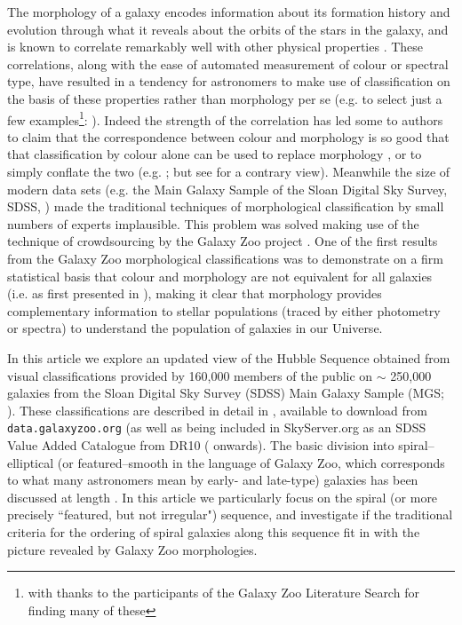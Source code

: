 \documentclass[usenatbib]{mn2e}
\begin{document}
The morphology of a galaxy encodes information about its formation history and evolution through what it reveals about the orbits of the stars in the galaxy, and is known to correlate remarkably well with other physical properties \citep[e.g.][]{RobertsHaynes1994, Kennicutt1998, Strateva2001}. These correlations, along with the ease of automated measurement of colour or spectral type, have resulted in a tendency for astronomers to make use of classification on the basis of these properties rather than morphology per se (e.g. to select just a few examples\footnote{with thanks to the participants of the Galaxy Zoo Literature Search for finding many of these}: \citealt{Bell2004, Weinmann2006, vandenBosch2008, Cooper2010, Zehavi2011}). Indeed the strength of the correlation has led some to authors to claim that the correspondence between colour and morphology is so good that that classification by colour alone can be used to replace morphology \citep[e.g.][]{ParkChoi2005, Faber2007, AscasibarAlmeida2011}, or to simply conflate the two (e.g. \citealt{TalvanDokkum2011}; but see \citealt{vandenBergh2007} for a contrary view). Meanwhile the size of modern data sets (e.g. the Main Galaxy Sample of the Sloan Digital Sky Survey, SDSS, \citealt{Strauss2002}) made the traditional techniques of morphological classification by small numbers of experts implausible. This problem was solved making use of the technique of crowdsourcing by the Galaxy Zoo project \citep{Lintott2008,Lintott2011}. One of the first results from the Galaxy Zoo morphological classifications was to demonstrate on a firm statistical basis that colour and morphology are not equivalent for all galaxies (i.e. as first presented in \citealt{Bamford2009, Schawinski2009,Masters2010}), making it clear that morphology provides complementary information to stellar populations (traced by either photometry or spectra) to understand the population of galaxies in our Universe.   

 In this article we explore an updated view of the Hubble Sequence obtained from visual classifications provided by 160,000 members of the public on $\sim$ 250,000 galaxies from the Sloan Digital Sky Survey (SDSS) Main Galaxy Sample (MGS; \citealt{Strauss2002}). These classifications are described in detail in \citep{Willett2013}, available to download from {\tt data.galaxyzoo.org} (as well as being included in SkyServer.org as an SDSS Value Added Catalogue from DR10 (\citealt{DR10} onwards). The basic division into spiral--elliptical (or featured--smooth in the language of Galaxy Zoo, which corresponds to what many astronomers mean by early- and late-type) galaxies has been discussed at length \citep[e.g.]{Willett2013}. In this article we particularly focus on the spiral (or more precisely ``featured, but not irregular") sequence, and investigate if the traditional criteria for the ordering of spiral galaxies along this sequence fit in with the picture revealed by Galaxy Zoo morphologies. 
\end{document}
